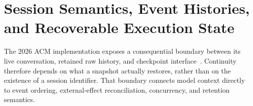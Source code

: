 \chapter{Session Semantics, Event Histories, and Recoverable Execution State}\label{ch:C13}

The 2026 ACM implementation exposes a consequential boundary between its live conversation, retained raw history, and checkpoint interface~\cite{repo_acm2026}. Continuity therefore depends on what a snapshot actually restores, rather than on the existence of a session identifier. That boundary connects model context directly to event ordering, external-effect reconciliation, concurrency, and retention semantics.









